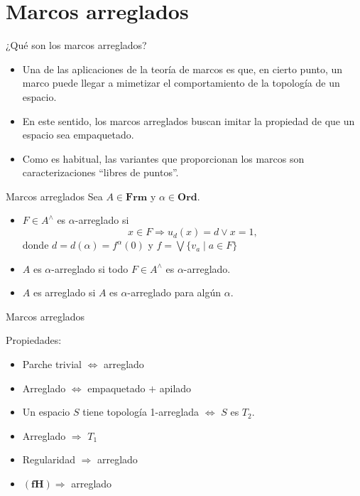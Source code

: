 \documentclass[compress,12pt]{beamer}
\begin{document}
\section{Marcos arreglados}
\begin{frame}{¿Qué son los marcos arreglados?}
    \begin{itemize}

    \item Una de las aplicaciones de la teoría de marcos es que, en cierto punto, un marco puede llegar a mimetizar el comportamiento de la topología de un espacio.\\

    \item En este sentido, los marcos arreglados buscan imitar la propiedad de que un espacio sea empaquetado.\\

    \item Como es habitual, las variantes que proporcionan los marcos son caracterizaciones ``libres de puntos''.
    \end{itemize}
\end{frame}

\begin{frame}{Marcos arreglados}
    Sea $A\in \mathbf{Frm}$ y $\alpha\in \mathbf{Ord}$. 
    \begin{itemize}
        \item $F\in A^\wedge$ es $\alpha$-arreglado si 
    \[
    x\in F\Rightarrow u_d(x)=d\vee x=1,
    \]
    donde $d=d(\alpha)=f^\alpha(0)$ y $f=\bigvee\{v_a\mid a\in F\}$
    \item $A$ es $\alpha$-arreglado si todo $F\in A^\wedge$ es $\alpha$-arreglado.
    \item $A$ es arreglado si $A$ es $\alpha$-arreglado para algún $\alpha$.
    \end{itemize}
\end{frame}

\begin{frame}{Marcos arreglados}
    \begin{block}{Propiedades:}
        \begin{itemize}
            \item Parche trivial $\Leftrightarrow$ arreglado
            \item Arreglado $\Leftrightarrow $ empaquetado $+$ apilado
            \item Un espacio $S$ tiene topología 1-arreglada $\Leftrightarrow$ $S$ es $T_2$.
            \item Arreglado $\Rightarrow$ $T_1$
            \item Regularidad $\Rightarrow$ arreglado
            \item $(\mathbf{fH})\Rightarrow$ arreglado
        \end{itemize}
    \end{block}
\end{frame}
\end{document}
